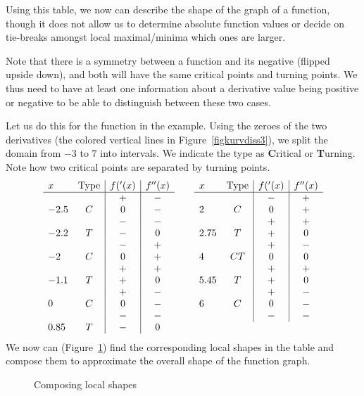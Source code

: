 Using this table, we now can describe the shape of the graph of a function,
though it does not allow us to determine absolute function values or
decide on tie-breaks amongst local maximal/minima which ones are larger.

Note that there is a symmetry between a function and its negative (flipped
upside down), and both will have the same critical points and turning
points. We thus need to have at least one information about a
derivative value being positive or negative to be able to distinguish
between these two cases.
\smallskip

Let us do this for the function in the example. Using the zeroes of the two
derivatives (the colored vertical lines in Figure~\ref{figkurvdiss3}), we
split the domain from $-3$ to $7$ into intervals. We indicate the type as
\textbf{C}ritical or \textbf{T}urning. Note how two critical points are
separated by turning points.
\[
\begin{array}{lc|c|c}
x&\mbox{Type}&f('(x)&f^{\prime\prime}(x)\\
\hline
&&+&-\\
-2.5&C&0&-\\
&&-&-\\
-2.2&T&-&0\\
&&-&+\\
-2&C&0&+\\
&&+&+\\
-1.1&T&+&0\\
&&+&-\\
0&C&0&-\\
&&-&-\\
0.85&T&-&0\\
\end{array}\qquad
\begin{array}{lc|c|c}
x&\mbox{Type}&f('(x)&f^{\prime\prime}(x)\\
\hline
&&-&+\\
2&C&0&+\\
&&+&+\\
2.75&T&+&0\\
&&+&-\\
4&CT&0&0\\
&&+&+\\
5.45&T&+&0\\
&&+&-\\
6&C&0&-\\
&&-&-\\
\\
\end{array}
\]
We now can (Figure~\ref{figfuncsynth}) find the corresponding local shapes in the table and compose them
to approximate the overall shape of the function graph.
\begin{figure}
\begin{center}
\end{center}
\caption{Composing local shapes}
\label{figfuncsynth}
\end{figure}


